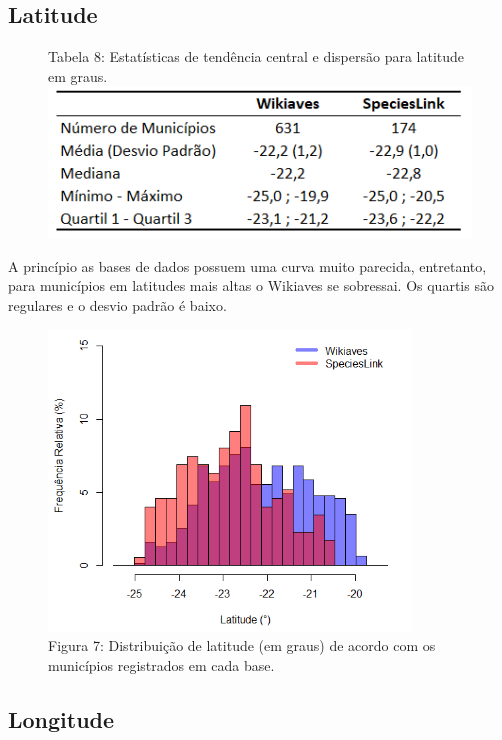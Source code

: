 \documentclass[12pt]{extarticle}
\newenvironment{resposta}{ \color{mygray}}{}
\begin{document}
\newpage

\subsection{Latitude}

\begin{figure}[h!]
\centering
{\scriptsize Tabela 8: Estatísticas de tendência central e dispersão para latitude em graus.}
\includegraphics{Imagens/T08.png}
\end{figure}

\begin{resposta}
A princípio as bases de dados possuem uma curva muito parecida, entretanto, para municípios em latitudes mais altas o Wikiaves se sobressai. Os quartis são regulares e o desvio padrão é baixo. 
\end{resposta}

\begin{figure}[h!]
\centering
\includegraphics[height = 8cm]{Imagens/H07.png}
\\{\scriptsize Figura 7: Distribuição de latitude (em graus) de acordo com os municípios registrados em cada base.}
\end{figure}

\newpage

\subsection{Longitude}
\end{document}
